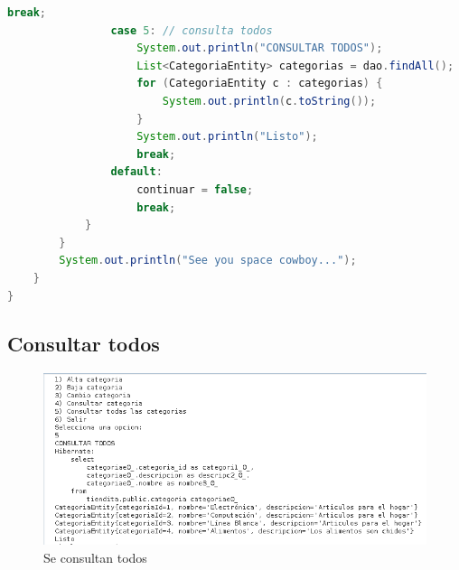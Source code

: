 \documentclass[a4paper,12pt]{article}
\begin{document}
\begin{lstlisting}[language=Java, style=customJava, 
caption={Tiendita.java}, captionpos=b,basicstyle=\fontfamily{cmss}\small]
                    break;
                case 5: // consulta todos
                    System.out.println("CONSULTAR TODOS");
                    List<CategoriaEntity> categorias = dao.findAll();
                    for (CategoriaEntity c : categorias) {
                        System.out.println(c.toString());
                    }
                    System.out.println("Listo");
                    break;
                default:
                    continuar = false;
                    break;
            }
        }
        System.out.println("See you space cowboy...");
    }
}
\end{lstlisting}

\subsection{Consultar todos}
\begin{figure}[H]
\begin{center}
 \includegraphics[width=\textwidth]{consultar_todos.png}
 \caption{Se consultan todos}
 \label{fig:todos}
\end{center}
\end{figure}
\end{document}
